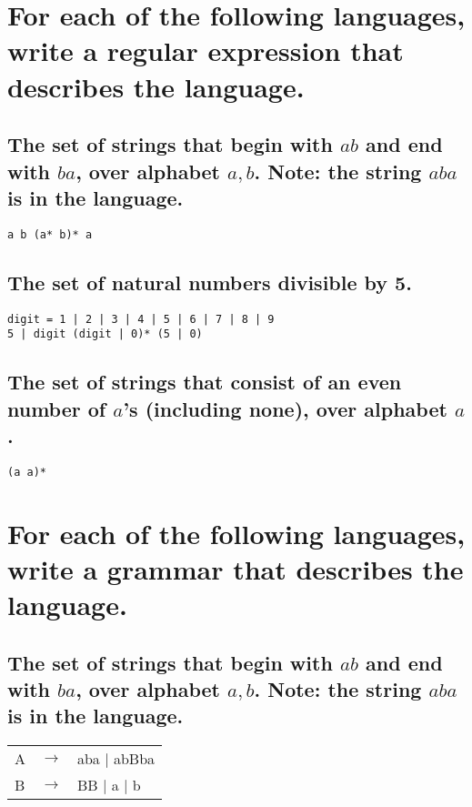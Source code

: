 \documentclass[letterpaper]{article}
\begin{document}
\section{For each of the following languages, write a regular expression that describes the language.}
\subsection{The set of strings that begin with $ab$ and end with $ba$, over alphabet ${a, b}$. Note: the string $aba$ is in the language.}
\begin{adjustwidth}{2.35em}{0pt}
\begin{verbatim}
a b (a* b)* a
\end{verbatim}
\end{adjustwidth}
\subsection{The set of natural numbers divisible by 5.}
\begin{adjustwidth}{2.35em}{0pt}
\begin{verbatim}
digit = 1 | 2 | 3 | 4 | 5 | 6 | 7 | 8 | 9
5 | digit (digit | 0)* (5 | 0)
\end{verbatim}
\end{adjustwidth}
\subsection{The set of strings that consist of an even number of $a$’s (including none), over alphabet ${a}$.}
\begin{adjustwidth}{2.35em}{0pt}
\begin{verbatim}
(a a)*
\end{verbatim}
\end{adjustwidth}

\section{For each of the following languages, write a grammar that describes the language.}
\subsection{The set of strings that begin with $ab$ and end with $ba$, over alphabet ${a, b}$. Note: the string $aba$ is in the language.}
\begin{adjustwidth}{2.35em}{0pt}
\begin{tabular}{l c l}
A & $\rightarrow$ & aba $|$ abBba \\
B & $\rightarrow$ & BB $|$ a $|$ b
\end{tabular}
\end{adjustwidth}
\end{document}
